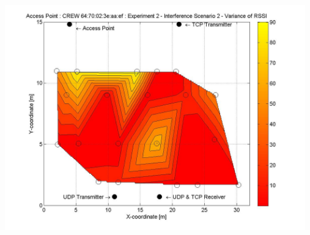 \documentclass[11pt,a4paper,headinclude,footinclude,chapterprefix=on]{scrreprt}
\begin{document}
\begin{longtable}
	\includegraphics[width=13cm]{../../Source/plot/CREW_ef/ef_Wifi_Ex_2_Variance.jpg} \\
\end{longtable}
\end{document}
